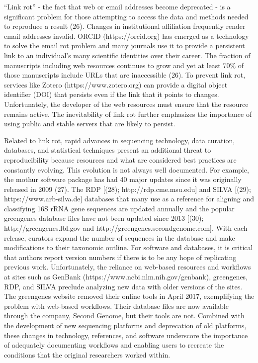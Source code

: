 \documentclass[]{article}
\begin{document}
``Link rot'' - the fact that web or email addresses become deprecated -
is a significant problem for those attempting to access the data and
methods needed to reproduce a result (26). Changes in institutional
affiliation frequently render email addresses invalid. ORCID
(https://orcid.org) has emerged as a technology to solve the email rot
problem and many journals use it to provide a persistent link to an
individual's many scientific identities over their career. The fraction
of manuscripts including web resources continues to grow and yet at
least 70\% of those manuscripts include URLs that are inaccessible (26).
To prevent link rot, services like Zotero (https://www.zotero.org) can
provide a digital object identifier (DOI) that persists even if the link
that it points to changes. Unfortunately, the developer of the web
resources must ensure that the resource remains active. The
inevitability of link rot further emphasizes the importance of using
public and stable servers that are likely to persist.

Related to link rot, rapid advances in sequencing technology, data
curation, databases, and statistical techniques present an additional
threat to reproducibility because resources and what are considered best
practices are constantly evolving. This evolution is not always well
documented. For example, the mothur software package has had 40 major
updates since it was originally released in 2009 (27). The RDP {[}(28);
http://rdp.cme.msu.edu{]} and SILVA {[}(29); https://www.arb-silva.de{]}
databases that many use as a reference for aligning and classifying 16S
rRNA gene sequences are updated annually and the popular greengenes
database files have not been updated since 2013 {[}(30);
http://greengenes.lbl.gov and http://greengenes.secondgenome.com{]}.
With each release, curators expand the number of sequences in the
database and make modifications to their taxonomic outline. For software
and databases, it is critical that authors report version numbers if
there is to be any hope of replicating previous work. Unfortunately, the
reliance on web-based resources and workflows at sites such as GenBank
(https://www.ncbi.nlm.nih.gov/genbank), greengenes, RDP, and SILVA
preclude analyzing new data with older versions of the sites. The
greengenes website removed their online tools in April 2017,
exemplifying the problem with web-based workflows. Their database files
are now available through the company, Second Genome, but their tools
are not. Combined with the development of new sequencing platforms and
deprecation of old platforms, these changes in technology, references,
and software underscore the importance of adequately documenting
workflows and enabling users to recreate the conditions that the
original researchers worked within.
\end{document}
